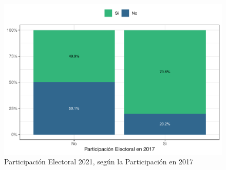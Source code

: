 \documentclass[
  12pt,
]{book}
\begin{document}
\begin{figure}

{\centering \includegraphics{reporte-elsoc_files/figure-latex/2020-vs-2021-1} 

}

\caption{Participación Electoral 2021, según la Participación en 2017}\label{fig:2020-vs-2021}
\end{figure}
\end{document}

